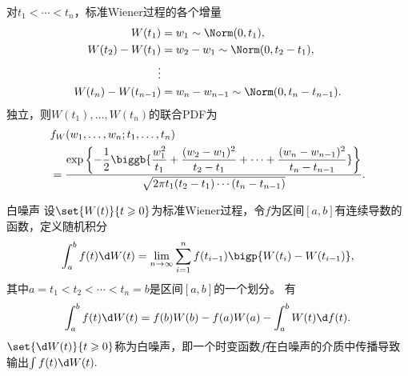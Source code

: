对$t_1<\cdots<t_n$，标准Wiener过程的各个增量
\begin{align*}
	W(t_1)&=w_1\sim\Norm(0,t_1),\\
	W(t_2)-W(t_1)&=w_2-w_1\sim\Norm(0,t_2-t_1),\\
	\vdots\\
	W(t_n)-W(t_{n-1})&=w_n-w_{n-1}\sim\Norm(0,t_n-t_{n-1}).
\end{align*}
独立，则$W(t_1),\ldots,W(t_n)$的联合PDF为 
\begin{align*}
	&f_W(w_1,\ldots,w_n;t_1,\ldots,t_n)\\
	&=\frac{\exp\bigg\{{-\dfrac12\biggb{\dfrac{w_1^2}{t_1}+\dfrac{(w_2-w_1)^2}{t_2-t_1}+\cdots+\dfrac{(w_n-w_{n-1})^2}{t_n-t_{n-1}}}\bigg\}}}{\sqrt{2\pi t_1(t_2-t_1)\cdots(t_n-t_{n-1})}}.
\end{align*}
\begin{example}{白噪声}{}
	设$\set{W(t)}{t\geqslant 0}$为标准Wiener过程，令$f$为区间$[a,b]$有连续导数的函数，定义随机积分
	\[
		\int_a^bf(t)\d W(t)=\lim_{n\to\infty}\sum_{i=1}^n f(t_{i-1})\bigp{W(t_i)-W(t_{i-1})},
	\]
	其中$a=t_1<t_2<\cdots<t_n=b$是区间$[a,b]$的一个划分。%
	有
	\[
		\int_a^bf(t)\d W(t)=f(b)W(b)-f(a)W(a)-\int_a^bW(t)\d f(t).
	\]
	$\set{\d W(t)}{t\geqslant 0}$称为白噪声，即一个时变函数$f$在白噪声的介质中传播导致输出$\textstyle\int f(t)\d W(t).$
\end{example}
